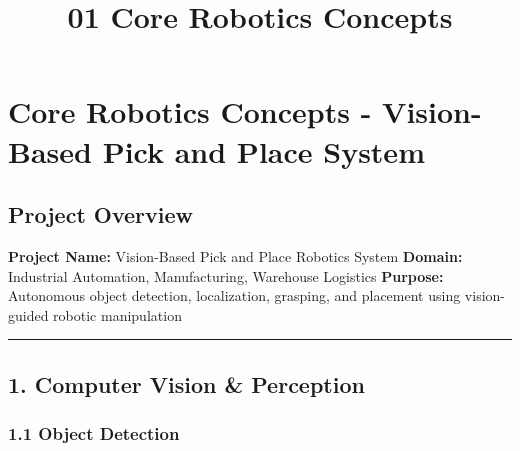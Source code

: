 \documentclass[
]{article}
\title{01 Core Robotics Concepts}
\author{}
\date{}
\begin{document}
\maketitle

{
\setcounter{tocdepth}{3}
\tableofcontents
}
\hypertarget{core-robotics-concepts---vision-based-pick-and-place-system}{%
\section{Core Robotics Concepts - Vision-Based Pick and Place
System}\label{core-robotics-concepts---vision-based-pick-and-place-system}}

\hypertarget{project-overview}{%
\subsection{Project Overview}\label{project-overview}}

\textbf{Project Name:} Vision-Based Pick and Place Robotics System
\textbf{Domain:} Industrial Automation, Manufacturing, Warehouse
Logistics \textbf{Purpose:} Autonomous object detection, localization,
grasping, and placement using vision-guided robotic manipulation

\begin{center}\rule{0.5\linewidth}{0.5pt}\end{center}

\hypertarget{computer-vision-perception}{%
\subsection{1. Computer Vision \&
Perception}\label{computer-vision-perception}}

\hypertarget{object-detection}{%
\subsubsection{1.1 Object Detection}\label{object-detection}}
\end{document}
